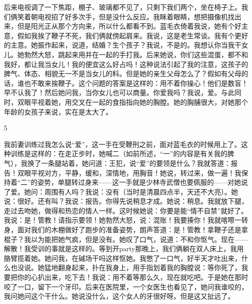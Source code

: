 后来电视调了一下焦距，棚子、玻璃都不见了，只剩下我们两个，坐在椅子上。我们俩笑着朝电视招了好多次手，但是没什么反应。我眯着眼睛，想把摄像机找出来，但是阳光正从那个方向来，所以什么都看不到。蓝毛衣倚着我说，她有个好主意，假如我挨了鞭子不死，我们俩就傍起肩来。我说，这是老生常谈。我有个更好的主意。她振作起来，说道，结婚？生个孩子？我说，不是的。我想认你当我干女儿。她勃然大怒，跳起来用并在一起的手打我。后来她说，你们这些混蛋，都不和我好，都让我当女儿！我的便宜这么好占吗！这种说法引起了我的注意，这孩子的脾气、体态、相貌无一不是当女儿的料。但是她的亲生父母怎么了？假如有父母的话，谁也不敢来挨鞭子。这个问题的答案是这样的：用不着你操心！他们是数盲！早不认我了！然后她问我，当你女儿也可以商量。你爱我吗？我说，爱。与此同时，双眼平视着她，用交叉在一起的食指指向她的胸膛。她的胸脯很大，对她那个年龄的女孩子来说，实在是太大了。 



5 

我前妻训练过我怎么说“爱”，这一手在受鞭刑之前，面对蓝毛衣的时候用上了。这种训练是这样的：在走正步时，她喊二（如前所述，“一”的内容是有关我的脾气），我换了一条腿站着，她问道：王犯，说“爱”的要领是什么？我就答道：报告！双眼平视对方，平静，缓和，深情地，用胸音！她说，转过来，做一遍！我保持着“二”的姿势，单腿转过身来——这一手就是少林寺武僧也要佩服的——对她说了爱。她问：周围有人吗？我说：没有（当时是清晨四点半，天还不大亮）。她说：很好。还有叫？我说：报告。你得先说稍息才成。她说：稍息。我就放下腿，走过去吻她，做得和热恋的情人一样。这时候她说：你要是能“情不自禁”就好了。我说：是！管教！请指示要领！她勃然大怒，说：混账！我要揍你！我就喀嚓一转身，面对我们的木棚做好了跑步的准备姿势，朗声答道：是！管教！拿鞭子还是拿棍子？我以为能把她气疯，但是没有。她叹了口气，说道：不和你怄气。现在——解散！我受训的事就是这样的。等到开party那晚上，我们俩躺在双人床上，我用胳臂揽着她。她问我，在碱场干吗这样怄她。我憋了一口气，好半天才吐出来，什么也没说。她猛地翻身起来，扑在我身上，用手指划着我的胸膛说：等你死了，我要把你的心扒出来，吃下去！我说：用不着等那么久，现在就吃吧。于是她在那时咬了一口，留下一个牙印。后来在医院里，一个女医生也看见了，她问我谁咬的，我问她问这个干什么。她说没什么，这个女人的牙很好呀。但是这又扯远了。 

